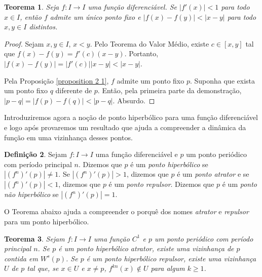 \documentclass[a4paper, 12pt]{article}
\theoremstyle{definition}
\newtheorem{definition}{Definição}[section]
\theoremstyle{plain}
\theoremstyle{plain}
\theoremstyle{plain}
\newtheorem{theorem}[definition]{Teorema}
\theoremstyle{remark}
\begin{document}
\begin{theorem}
Seja $f:I \rightarrow I$ uma função diferenciável. Se $|f'(x)|<1$ para todo $x \in I$, então $f$ admite um único ponto fixo e $|f(x) - f(y)| < |x - y|$ para todo $x, y \in I$ distintos.
\end{theorem}

\begin{proof}
Sejam $x, y \in I$, $x < y$. Pelo Teorema do Valor Médio, existe $c \in [x, y]$ tal que $f(x) - f(y) = f'(c)(x - y)$. Portanto, $|f(x) - f(y)| = |f'(c)||x - y| < |x - y|$.

Pela Proposição \ref{proposition 2 1}, $f$ admite um ponto fixo $p$. Suponha que exista um ponto fixo $q$ diferente de $p$. Então, pela primeira parte da demonstração, $|p - q| = |f(p) - f(q)| < |p - q|$. Absurdo.
\end{proof}

Introduziremos agora a noção de ponto hiperbólico para uma função diferenciável e logo após provaremos um resultado que ajuda a compreender a dinâmica da função em uma vizinhança desses pontos.

\begin{definition}
Sejam $f: I \rightarrow I$ uma função diferenciável e $p$ um ponto periódico com período principal $n$. Dizemos que $p$ é um \textit{ponto hiperbólico} se $|(f^n)'(p)| \neq 1$. Se $|(f^n)'(p)| > 1$, dizemos que $p$ é um \textit{ponto atrator} e se $|(f^n)'(p)| < 1$, dizemos que $p$ é um \textit{ponto  repulsor}. Dizemos que $p$ é um \textit{ponto não hiperbólico} se $|(f^n)'(p)| = 1$.
\end{definition}

O Teorema abaixo ajuda a compreender o porquê dos nomes \textit{atrator} e \textit{repulsor} para um ponto hiperbólico.

\begin{theorem}
Sejam $f: I \rightarrow I$ uma função $C^1$ e $p$ um ponto periódico com período principal $n$. Se $p$ é um ponto hiperbólico atrator, existe uma vizinhança de $p$ contida em $W^s(p)$. Se $p$ é um ponto hiperbólico repulsor, existe uma vizinhança $U$ de $p$ tal que, se $x \in U$ e $x \neq p$, $f^{kn}(x) \notin U$ para algum $k \geq 1$. 
\end{theorem}
\end{document}
